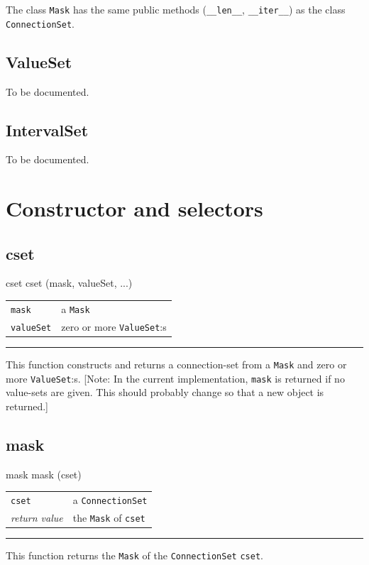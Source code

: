 \documentclass[a4paper,twoside]{report}
\makeatletter
\newenvironment{parameters}%
{\begin{tabular}{@{\hspace{2em}}lp{0.6\textwidth}}}%
{\end{tabular}\par\vspace{1mm}\par\hrule\par\vspace{5mm}}
\newcommand{\cls}[1]{\lstinline|#1|}
\newcommand{\expr}[1]{\lstinline|#1|}
\makeatother
\begin{document}
The class \cls{Mask} has the same public methods (\expr{__len__},
\expr{__iter__}) as the class \cls{ConnectionSet}.

\subsection{ValueSet}
To be documented.

\subsection{IntervalSet}\label{sec:intervalset}
To be documented.

\section{Constructor and selectors}

\subsection{cset}

\begin{head}{cset}
  cset (mask, valueSet, ...)
\end{head}
\begin{parameters}
  \lstinline|mask| &%
  a \lstinline|Mask| \\
  \lstinline|valueSet| &%
  zero or more \lstinline|ValueSet|:s \\
\end{parameters}
This function constructs and returns a connection-set from a
\lstinline|Mask| and zero or more \lstinline|ValueSet|:s.  [Note: In
  the current implementation, \lstinline|mask| is returned if no
  value-sets are given.  This should probably change so that a new
  object is returned.]

\subsection{mask}

\begin{head}{mask}
  mask (cset)
\end{head}
\begin{parameters}
  \lstinline|cset| &%
  a \lstinline|ConnectionSet|\\
  \emph{return value} &%
  the \lstinline|Mask| of \lstinline|cset|\\
\end{parameters}
This function returns the \lstinline|Mask| of the
\lstinline|ConnectionSet| \lstinline|cset|.
\end{document}
